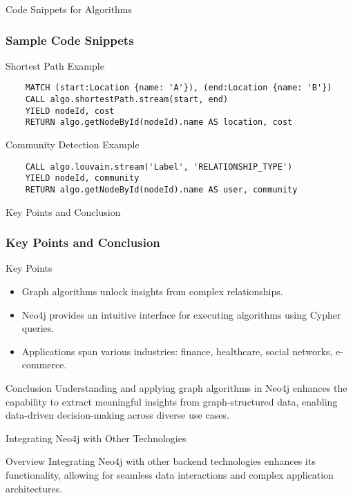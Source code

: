 \documentclass[aspectratio=169]{beamer}
\begin{document}
\begin{frame}[fragile]{Code Snippets for Algorithms}
  \frametitle{Sample Code Snippets}
  \begin{block}{Shortest Path Example}
    \begin{lstlisting}
    MATCH (start:Location {name: 'A'}), (end:Location {name: 'B'})
    CALL algo.shortestPath.stream(start, end)
    YIELD nodeId, cost
    RETURN algo.getNodeById(nodeId).name AS location, cost
    \end{lstlisting}
  \end{block}

  \begin{block}{Community Detection Example}
    \begin{lstlisting}
    CALL algo.louvain.stream('Label', 'RELATIONSHIP_TYPE')
    YIELD nodeId, community
    RETURN algo.getNodeById(nodeId).name AS user, community
    \end{lstlisting}
  \end{block}
\end{frame}

\begin{frame}[fragile]{Key Points and Conclusion}
  \frametitle{Key Points and Conclusion}
  \begin{block}{Key Points}
    \begin{itemize}
      \item Graph algorithms unlock insights from complex relationships.
      \item Neo4j provides an intuitive interface for executing algorithms using Cypher queries.
      \item Applications span various industries: finance, healthcare, social networks, e-commerce.
    \end{itemize}
  \end{block}

  \begin{block}{Conclusion}
    Understanding and applying graph algorithms in Neo4j enhances the capability to extract meaningful insights from graph-structured data, enabling data-driven decision-making across diverse use cases.
  \end{block}
\end{frame}

\begin{frame}{Integrating Neo4j with Other Technologies}
  \begin{block}{Overview}
    Integrating Neo4j with other backend technologies enhances its functionality, allowing for seamless data interactions and complex application architectures.
  \end{block}
\end{frame}
\end{document}
